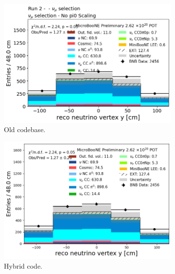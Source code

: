 \begin{figure}[H]
    \centering
    \begin{subfigure}[t]{0.32\linewidth}
        \includegraphics[width=\linewidth]{technote/Appendix_Validation/Figures/Numu/Run2_Vertex_Y_Old.png}
        \caption{Old codebase.}
    \end{subfigure}%
    \hspace{0.2cm}%
    \begin{subfigure}[t]{0.32\linewidth}
        \includegraphics[width=\linewidth]{technote/Appendix_Validation/Figures/Numu/Run2_Vertex_Y_Chris.png}
        \caption{Hybrid code.}
    \end{subfigure}%
    \hspace{0.2cm}%
    \begin{subfigure}[t]{0.32\linewidth}

\end{subfigure}
\end{figure}
